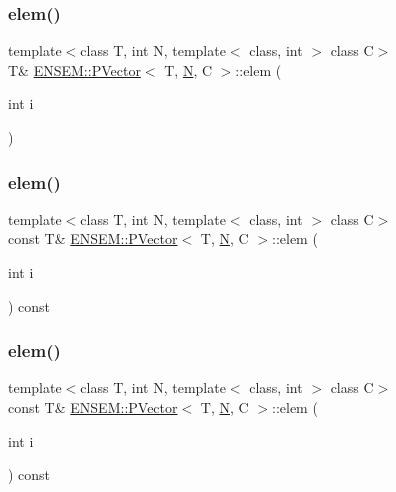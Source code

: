 \subsubsection{\texorpdfstring{elem()}{elem()}\hspace{0.1cm}{\footnotesize\ttfamily [2/4]}}
{\footnotesize\ttfamily template$<$class T, int N, template$<$ class, int $>$ class C$>$ \\
T\& \mbox{\hyperlink{classENSEM_1_1PVector}{E\+N\+S\+E\+M\+::\+P\+Vector}}$<$ T, \mbox{\hyperlink{operator__name__util_8cc_a7722c8ecbb62d99aee7ce68b1752f337}{N}}, C $>$\+::elem (\begin{DoxyParamCaption}\item[{int}]{i }\end{DoxyParamCaption})\hspace{0.3cm}{\ttfamily [inline]}}

\mbox{\label{classENSEM_1_1PVector_a7c7ccc3b772ecddfeb58bb552ffcdbb9}} 
\subsubsection{\texorpdfstring{elem()}{elem()}\hspace{0.1cm}{\footnotesize\ttfamily [3/4]}}
{\footnotesize\ttfamily template$<$class T, int N, template$<$ class, int $>$ class C$>$ \\
const T\& \mbox{\hyperlink{classENSEM_1_1PVector}{E\+N\+S\+E\+M\+::\+P\+Vector}}$<$ T, \mbox{\hyperlink{operator__name__util_8cc_a7722c8ecbb62d99aee7ce68b1752f337}{N}}, C $>$\+::elem (\begin{DoxyParamCaption}\item[{int}]{i }\end{DoxyParamCaption}) const\hspace{0.3cm}{\ttfamily [inline]}}

\mbox{\label{classENSEM_1_1PVector_a7c7ccc3b772ecddfeb58bb552ffcdbb9}} 
\subsubsection{\texorpdfstring{elem()}{elem()}\hspace{0.1cm}{\footnotesize\ttfamily [4/4]}}
{\footnotesize\ttfamily template$<$class T, int N, template$<$ class, int $>$ class C$>$ \\
const T\& \mbox{\hyperlink{classENSEM_1_1PVector}{E\+N\+S\+E\+M\+::\+P\+Vector}}$<$ T, \mbox{\hyperlink{operator__name__util_8cc_a7722c8ecbb62d99aee7ce68b1752f337}{N}}, C $>$\+::elem (\begin{DoxyParamCaption}\item[{int}]{i }\end{DoxyParamCaption}) const\hspace{0.3cm}{\ttfamily [inline]}}

